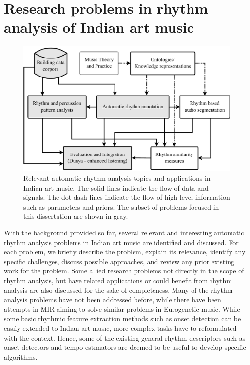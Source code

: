 \section[Research problems in rhythm analysis]{Research problems in rhythm\\ analysis of Indian art music}\label{sec:probs:iamrhythm}
\begin{figure}
\centering
\includegraphics[width=\textwidth]{figs/blockDiags/ResearchProblems.pdf}
\caption[Relevant automatic rhythm analysis problems in Indian art music]{Relevant automatic rhythm analysis topics and applications in Indian art music. The solid lines indicate the flow of data and signals. The dot-dash lines indicate the flow of high level information such as parameters and priors. The subset of problems focused in this dissertation are shown in gray.}\label{fig:probdef:iamprob}
\end{figure}
With the background provided so far, several relevant and interesting automatic rhythm analysis problems in Indian art music are identified and discussed. For each problem, we briefly describe the problem, explain its relevance, identify any specific challenges, discuss possible approaches, and review any prior existing work for the problem. Some allied research problems not directly in the scope of rhythm analysis, but have related applications or could benefit from rhythm analysis are also discussed for the sake of completeness. Many of the rhythm analysis problems have not been addressed before, while there have been attempts in \gls{MIR} aiming to solve similar problems in Eurogenetic music. While some basic rhythmic feature extraction methods such as onset detection can be easily extended to Indian art music, more complex tasks have to reformulated with the context. Hence, some of the existing general rhythm descriptors such as onset detectors and tempo estimators are deemed to be useful to develop specific algorithms. %

